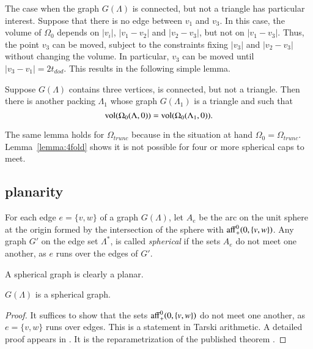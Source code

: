 The case when the graph $G(\Lambda)$ is connected, but not a triangle
has particular interest.  Suppose that there is no edge between
$v_1$ and $v_3$. In this case, the volume of $\Omega_0$ depends on
$|v_i|$, $|v_1-v_2|$ and $|v_2-v_3|$, but not on $|v_1-v_3|$.
Thus, the point $v_3$ can be moved, subject to the constraints
fixing $|v_3|$ and $|v_2-v_3|$ without changing the volume.
In particular, $v_3$ can be moved until $|v_3-v_1|=2t_{dod}$.  This
results in the following simple lemma.  

\begin{lemma}\label{lemma:3tri}  
Suppose $G(\Lambda)$ contains three vertices,
is connected, but not a triangle.  Then there is another packing
$\Lambda_1$ whose graph $G(\Lambda_1)$ is a triangle and such
that
  $$
  {\operatorname{vol}}(\Omega_0(\Lambda,0)) = {\operatorname{vol}}(\Omega_0(\Lambda_1,0)).
  $$
\end{lemma}

The same lemma holds
for $\Omega_{trunc}$ because in the situation at hand $\Omega_0=\Omega_{trunc}$.
Lemma~\ref{lemma:4fold} shows it is not possible for four or more
spherical caps to meet.

\subsection{planarity}

\begin{definition}[spherical]
For each edge $e=\{v,w\}$ of a graph $G(\Lambda)$,
let $A_e$ be the arc on the unit sphere at the origin formed
by the intersection of the sphere with ${\operatorname{aff}}^0_+(0,\{v,w\})$.
Any graph $G'$ on the edge set $\Lambda^*$, is called
{\it spherical} if the sets $A_e$ do not meet one
another, as $e$ runs over the edges of $G'$.  
\end{definition}

A spherical graph is clearly a planar.

\begin{lemma}\label{lemma:planar}  
$G(\Lambda)$ is a spherical graph.
\end{lemma}

\begin{proof}  It suffices to show that the sets
${\operatorname{aff}}^0_+(0,\{v,w\})$ do not meet one another, as $e=\{v,w\}$
runs over edges.  This is a statement in Tarski arithmetic.
A detailed proof appears in \cite[Lemma~3.2]{arx}.  
It is the reparametrization
of the published theorem \cite[Lemma~3.10]{Part1}.
\end{proof}


